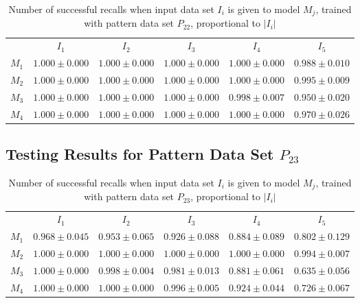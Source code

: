 \documentclass[anon]{CI}
\begin{document}
		\begin{table}[H]
			\centering
			\def\arraystretch{1.5}
			\footnotesize
			\begin{tabular}{cccccc}
				
				& $I_{1}$  & $I_{2}$  & $I_{3}$  & $I_{4}$  & $I_{5}$ \\ \cline{2-6}
				$M_{1}$  & $1.000\pm0.000$  & $1.000\pm0.000$  & $1.000\pm0.000$  & $1.000\pm0.000$  & $0.988\pm0.010$ \\
				$M_{2}$  & $1.000\pm0.000$  & $1.000\pm0.000$  & $1.000\pm0.000$  & $1.000\pm0.000$  & $0.995\pm0.009$ \\
				$M_{3}$  & $1.000\pm0.000$  & $1.000\pm0.000$  & $1.000\pm0.000$  & $0.998\pm0.007$  & $0.950\pm0.020$ \\
				$M_{4}$  & $1.000\pm0.000$  & $1.000\pm0.000$  & $1.000\pm0.000$  & $1.000\pm0.000$  & $0.970\pm0.026$ \\
				
			\end{tabular}
			\caption{Number of successful recalls when input data set $I_i$ is given to model $M_j$, trained with pattern data set $P_{22}$, proportional to $\left|I_i\right|$}
		\end{table}
		
		\subsection{Testing Results for Pattern Data Set $P_{23}$}
		
		
		\begin{table}[H]
			\centering
			\def\arraystretch{1.5}
			\footnotesize
			\begin{tabular}{cccccc}
				
				& $I_{1}$  & $I_{2}$  & $I_{3}$  & $I_{4}$  & $I_{5}$ \\ \cline{2-6}
				$M_{1}$  & $0.968\pm0.045$  & $0.953\pm0.065$  & $0.926\pm0.088$  & $0.884\pm0.089$  & $0.802\pm0.129$ \\
				$M_{2}$  & $1.000\pm0.000$  & $1.000\pm0.000$  & $1.000\pm0.000$  & $1.000\pm0.000$  & $0.994\pm0.007$ \\
				$M_{3}$  & $1.000\pm0.000$  & $0.998\pm0.004$  & $0.981\pm0.013$  & $0.881\pm0.061$  & $0.635\pm0.056$ \\
				$M_{4}$  & $1.000\pm0.000$  & $1.000\pm0.000$  & $0.996\pm0.005$  & $0.924\pm0.044$  & $0.726\pm0.067$ \\
				
			\end{tabular}
			\caption{Number of successful recalls when input data set $I_i$ is given to model $M_j$, trained with pattern data set $P_{23}$, proportional to $\left|I_i\right|$}
		\end{table}
		
\end{document}
